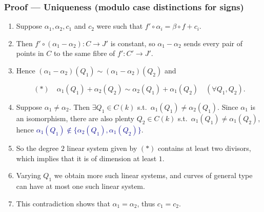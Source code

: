 \documentclass[notheorems, hyperref]{beamer}
\theoremstyle{darkgreentheorem}
\theoremstyle{darkbluedefinition}
\theoremstyle{darkredexample}
\theoremstyle{remark}
\begin{document}
\begin{frame}
    \frametitle{Proof --- Uniqueness (modulo case distinctions for signs)}
    \begin{enumerate}[label=\textbullet]
	\item Suppose $\alpha_{1},\alpha_{2},c_{1}$ and $c_{2}$ were such that $f'\circ\alpha_{i}=\beta\circ f+c_{i}$.
	    \pause
	\item Then $f'\circ (\alpha_{1}-\alpha_{2})\colon C\to J'$ is constant, so $\alpha_{1}-\alpha_{2}$ sends every pair of points in $C$ to the same fibre of $f'\colon C'\to J'$.
	    \pause
	\item Hence $(\alpha_{1}-\alpha_{2})(Q_{1})\sim (\alpha_{1}-\alpha_{2})(Q_{2})$ and
	    \begin{tcolorbox}[colback=yellow!5!white,colframe=yellow!5!white]
		\vspace{-1em}
		\[ (*) \quad \alpha_{1}(Q_{1})+\alpha_{2}(Q_{2})\sim \alpha_{2}(Q_{1})+\alpha_{1}(Q_{2})\quad (\forall Q_{1},Q_{2}). \]
	    \end{tcolorbox}
	    \vspace{-0.5em}
	    \pause
	\item Suppose $\alpha_{1}\neq \alpha_{2}$.
	    Then $\exists Q_{1}\in C(k)$ s.t.~$\alpha_{1}(Q_{1})\neq \alpha_{2}(Q_{1})$.
	    Since $\alpha_{1}$ is an isomorphism, there are also plenty $Q_{2}\in C(k)$ s.t.~$\alpha_{1}(Q_{1})\neq \alpha_{1}(Q_{2})$, hence \textcolor{darkblue}{$\alpha_{1}(Q_{1})\not\in \{\alpha_{2}(Q_{1}),\alpha_{1}(Q_{2})\}$}.
	    \pause
	\item So the degree $2$ linear system given by $(*)$ contains at least two divisors, which implies that it is of dimension at least $1$.
	    \pause
	\item Varying $Q_{1}$ we obtain more such linear systems, and curves of general type can have at most one such linear system.
	    \pause
	\item This contradiction shows that $\alpha_{1}=\alpha_{2}$, thus $c_{1}=c_{2}$.
    \end{enumerate}
\end{frame}
\end{document}
